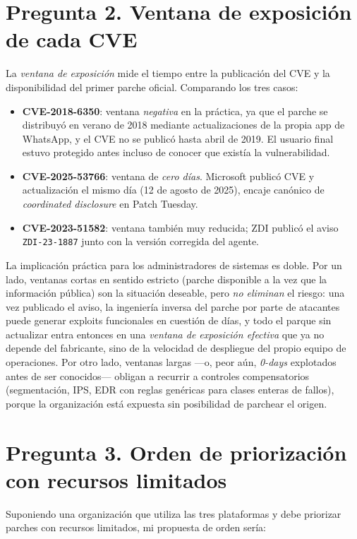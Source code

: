 \section*{Pregunta 2. Ventana de exposición de cada CVE}

La \textit{ventana de exposición} mide el tiempo entre la publicación del CVE y la disponibilidad del primer parche oficial. Comparando los tres casos:

\begin{itemize}[leftmargin=*]
    \item \textbf{CVE-2018-6350}: ventana \textit{negativa} en la práctica, ya que el parche se distribuyó en verano de 2018 mediante actualizaciones de la propia app de WhatsApp, y el CVE no se publicó hasta abril de 2019. El usuario final estuvo protegido antes incluso de conocer que existía la vulnerabilidad.
    \item \textbf{CVE-2025-53766}: ventana de \textit{cero días}. Microsoft publicó CVE y actualización el mismo día (12 de agosto de 2025), encaje canónico de \textit{coordinated disclosure} en Patch Tuesday.
    \item \textbf{CVE-2023-51582}: ventana también muy reducida; ZDI publicó el aviso \texttt{ZDI-23-1887} junto con la versión corregida del agente.
\end{itemize}

La implicación práctica para los administradores de sistemas es doble. Por un lado, ventanas cortas en sentido estricto (parche disponible a la vez que la información pública) son la situación deseable, pero \textit{no eliminan} el riesgo: una vez publicado el aviso, la ingeniería inversa del parche por parte de atacantes puede generar exploits funcionales en cuestión de días, y todo el parque sin actualizar entra entonces en una \textit{ventana de exposición efectiva} que ya no depende del fabricante, sino de la velocidad de despliegue del propio equipo de operaciones. Por otro lado, ventanas largas ---o, peor aún, \textit{0-days} explotados antes de ser conocidos--- obligan a recurrir a controles compensatorios (segmentación, IPS, EDR con reglas genéricas para clases enteras de fallos), porque la organización está expuesta sin posibilidad de parchear el origen.

\section*{Pregunta 3. Orden de priorización con recursos limitados}

Suponiendo una organización que utiliza las tres plataformas y debe priorizar parches con recursos limitados, mi propuesta de orden sería:

